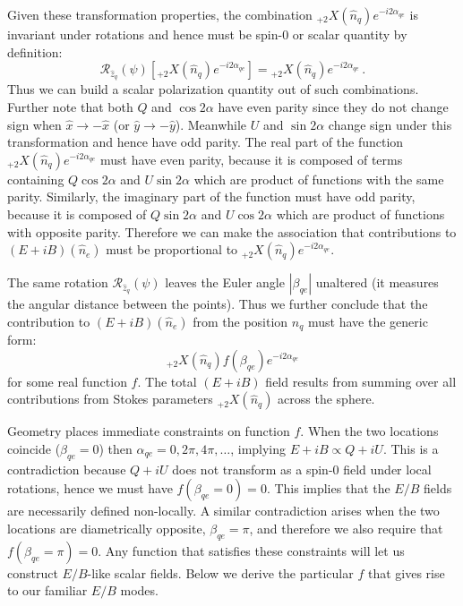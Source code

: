 \documentclass[a4paper,11pt]{article}
\newcommand{\beq}{\begin{equation}}
\newcommand{\eeq}{\end{equation}}
\begin{document}
Given these transformation properties, the combination ${}_{+2}X(\hat{n}_q)e^{-i2\alpha_{qe}}$ is invariant under rotations and hence must be spin-0 or scalar quantity by definition:
\beq
\mathcal{R}_{\hat{z}_q}(\psi)[{}_{+2}X(\hat{n}_q)e^{-i2\alpha_{qe}}] = {}_{+2}X(\hat{n}_q) e^{-i2\alpha_{qe}} \,. \label{eq:invariant}
\eeq
Thus we can build a scalar polarization quantity out of such combinations.
Further note that both $Q$ and $\cos2 \alpha$ have even parity since they do not change sign when $\hat{x} \rightarrow -\hat{x}$ (or $\hat{y} \rightarrow -\hat{y}$).  Meanwhile $U$ and $\sin 2 \alpha$ change sign under this transformation and hence have odd parity. The real part of the function  ${}_{+2}X(\hat{n}_q)e^{-i2\alpha_{qe}}$ must have even parity, because it is composed of terms containing $Q\cos{2\alpha}$ and  $U\sin{2 \alpha}$ which are product of functions with the same parity. Similarly, the imaginary part of the function must have odd parity, because it is composed of $Q\sin{2 \alpha}$ and $U\cos{2\alpha}$ which are product of functions with opposite parity.  Therefore we can make the association that contributions to  $(E+iB)(\hat n_e)$ must be proportional to $ {}_{+2}X(\hat{n}_q) e^{-i2\alpha_{qe}}$.


The same rotation $\mathcal{R}_{\hat{z}_q}(\psi)$ leaves the Euler angle $|\beta_{qe}|$ unaltered (it measures the angular distance between the points).  Thus we further conclude that the contribution to $(E+iB)(\hat n_e)$ from the position $\hat{n}_q$ must have the generic form:
\beq
{}_{+2}X(\hat{n}_q) f(\beta_{qe})  e^{-i2\alpha_{qe}}
\eeq
for some real function $f$. The total $(E+iB)$ field results from summing over all  contributions  from Stokes parameters ${}_{+2}X(\hat{n}_q)$ across the sphere.

Geometry places immediate constraints on function $f$.  When the two locations coincide ($\beta_{qe}=0$) then  $\alpha_{qe}=0,2\pi,4\pi,\dots$, implying $E + iB \propto Q+iU$.  This is a contradiction because $Q+iU$ does not transform as a spin-0 field under local rotations, hence we must have $f(\beta_{qe} = 0 ) = 0$. This implies that the $E/B$ fields are necessarily defined non-locally.  A similar contradiction arises when the two locations are diametrically opposite, $\beta_{qe} = \pi$, and therefore we also require that $f(\beta_{qe} = \pi ) = 0$.  Any function that satisfies these constraints will let us construct $E/B$-like scalar fields.   Below we derive the particular $f$ that gives rise to our familiar $E/B$ modes.
\end{document}

